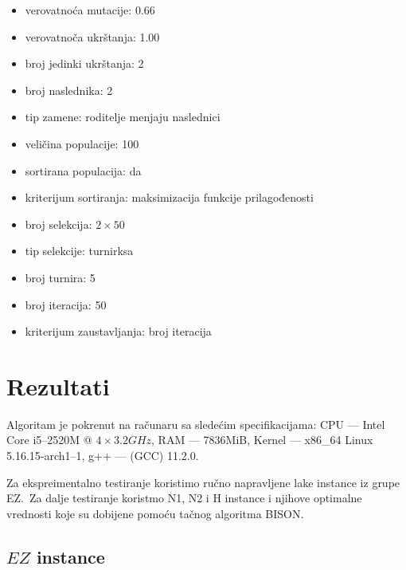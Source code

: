 \documentclass[a4paper,12pt,twocolumn]{article}
\begin{document}
\begin{itemize}
    \item verovatnoća mutacije: 0.66
    \item verovatnoča ukrštanja: 1.00
    \item broj jedinki ukrštanja: 2
    \item broj naslednika: 2
    \item tip zamene: roditelje menjaju naslednici
    \item veličina populacije: 100
    \item sortirana populacija: da
    \item kriterijum sortiranja: maksimizacija funkcije prilagođenosti
    \item broj selekcija: $2 \times 50$
    \item tip selekcije: turnirksa
    \item broj turnira: 5
    \item broj iteracija: 50
    \item kriterijum zaustavljanja: broj iteracija
\end{itemize}

\section{Rezultati}

Algoritam je pokrenut na računaru sa sledećim specifikacijama: 
CPU --- Intel Core i5--2520M @ $4 \times 3.2GHz$,
RAM --- 7836MiB,
Kernel --- x86\_64 Linux 5.16.15-arch1--1,
g++ --- (GCC) 11.2.0.

Za ekspreimentalno testiranje koristimo ručno napravljene lake
instance iz grupe EZ.\ Za dalje testiranje koristmo N1, N2 i 
H instance i njihove optimalne vrednosti koje su dobijene pomoću 
tačnog algoritma BISON\cite{skj97}.

\subsection{$EZ$ instance}


\end{document}
